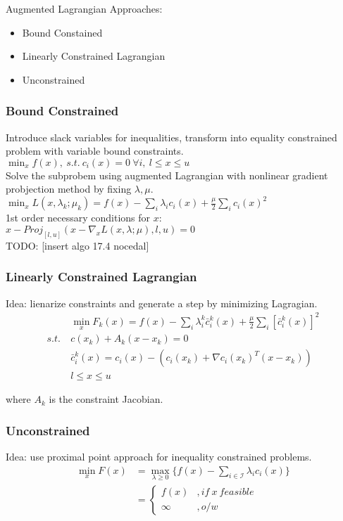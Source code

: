 \documentclass[8pt,letter]{article}
\begin{document}
\begin{multicols*}{2}
    Augmented Lagrangian Approaches:
    \begin{itemize}
    \item Bound Constained
    \item Linearly Constrained Lagrangian
    \item Unconstrained
    \end{itemize}

    \subsubsection{Bound Constrained}
    Introduce slack variables for inequalities, transform into equality constrained problem with variable bound constraints.\\

    $\min_x f(x),\ s.t.\ c_i(x) = 0\ \forall i,\ l \leq x \leq u$\\
    
    Solve the subprobem using augmented Lagrangian with nonlinear gradient probjection method by fixing $\lambda, \mu$.\\
    $\min_x L(x, \lambda_k; \mu_k) = f(x) - \sum_i \lambda_i c_i(x) + \frac{\mu}{2}\sum_i c_i(x)^2$\\
    
    1st order necessary conditions for $x$:\\
    $x - Proj_{[l,u]}(x-\nabla_x L(x,\lambda; \mu), l, u) = 0$\\

    TODO: [insert algo 17.4 nocedal]

    \subsubsection{Linearly Constrained Lagrangian}
    Idea: lienarize constraints and generate a step by minimizing Lagragian.
    \begin{align*}
      & \min_x F_k(x) = f(x) - \sum_i \lambda_i^k \bar{c}_i^k(x) + \frac{\mu}{2} \sum_i [\bar{c}_i^k(x)]^2\\
      s.t.\ & c(x_k) + A_k(x-x_k)=0\\
      & \bar{c}_i^k(x) = c_i(x) - (c_i(x_k) + \nabla c_i(x_k)^T (x-x_k))\\
      & l \leq x \leq u
    \end{align*}

    where $A_k$ is the constraint Jacobian.\\

    \subsubsection{Unconstrained}
    Idea: use proximal point approach for inequality constrained problems.
    \begin{align*}
      \min_x F(x) & = \max_{\lambda \geq 0} \{f(x) - \sum_{i \in \mathcal{I}} \lambda_i c_i(x) \} \\
      &= \begin{cases}
        f(x) &, if\ x\ feasible\\
        \infty &, o/w
      \end{cases}
    \end{align*}
    

\end{multicols*}
\end{document}
